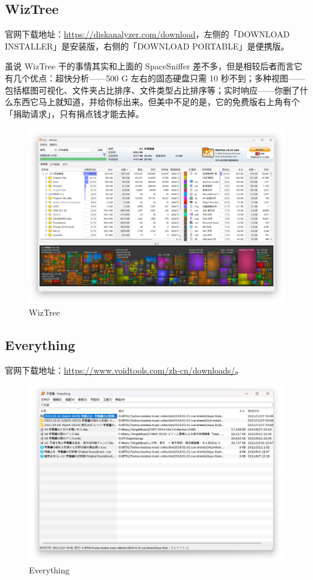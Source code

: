\subsection{WizTree}

官网下载地址：\url{https://diskanalyzer.com/download}，左侧的「DOWNLOAD INSTALLER」是安装版，右侧的「DOWNLOAD PORTABLE」是便携版。

虽说 WizTree 干的事情其实和上面的 SpaceSniffer 差不多，但是相较后者而言它有几个优点：超快分析——500 G 左右的固态硬盘只需 10 秒不到；多种视图——包括框图可视化、文件夹占比排序、文件类型占比排序等；实时响应——你删了什么东西它马上就知道，并给你标出来。但美中不足的是，它的免费版右上角有个「捐助请求」，只有捐点钱才能去掉。

\begin{figure}[htb!]
  \centering
  \includegraphics[width=.7\textwidth]{assets/software/WizTree.png}
  \caption{WizTree}
  \label{fig:WizTree}
\end{figure}

\subsection{Everything}

官网下载地址：\url{https://www.voidtools.com/zh-cn/downloads/}。

\begin{figure}[htb!]
  \centering
  \includegraphics[width=.7\textwidth]{assets/software/Everything.png}
  \caption{Everything}
  \label{Everything}
\end{figure}

